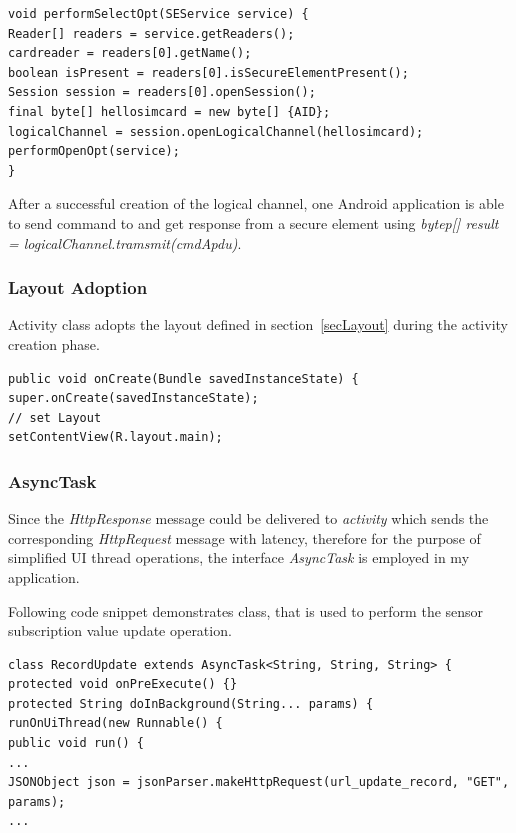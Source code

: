 \begin{Verbatim}[fontsize=\relsize{-1},frame=lines,framesep=4mm, label=\fbox{\small\emph{Service and Logical Channel Creation}}]
void performSelectOpt(SEService service) {
Reader[] readers = service.getReaders();
cardreader = readers[0].getName();
boolean isPresent = readers[0].isSecureElementPresent();
Session session = readers[0].openSession();
final byte[] hellosimcard = new byte[] {AID};
logicalChannel = session.openLogicalChannel(hellosimcard);
performOpenOpt(service);
}
\end{Verbatim}
After a successful creation of the logical channel, one Android application is able to send command to and get response from a secure element using \emph{bytep[] result = logicalChannel.tramsmit(cmdApdu)}.
\subsubsection{Layout Adoption}
Activity class adopts the layout defined in section~\ref{secLayout} during the activity creation phase.

\begin{Verbatim}[fontsize=\relsize{-1},frame=lines,framesep=4mm, label=\fbox{\small\emph{Layout Adoption}}]
public void onCreate(Bundle savedInstanceState) {
super.onCreate(savedInstanceState);
// set Layout
setContentView(R.layout.main);
\end{Verbatim}

\subsubsection{AsyncTask}
Since the \emph{HttpResponse} message could be delivered to \emph{activity} which sends the  corresponding \emph{HttpRequest} message with latency, therefore for the purpose of simplified UI thread operations, the interface \emph{AsyncTask} is employed in my application.

Following code snippet demonstrates class, that is used to perform the sensor subscription value update operation. 
\begin{Verbatim}[fontsize=\relsize{-1},frame=lines,framesep=4mm, label=\fbox{\small\emph{AsyncTask HttpRequest}}]
class RecordUpdate extends AsyncTask<String, String, String> {
protected void onPreExecute() {}	
protected String doInBackground(String... params) {
runOnUiThread(new Runnable() {
public void run() {
...
JSONObject json = jsonParser.makeHttpRequest(url_update_record, "GET", params);
...
\end{Verbatim}

